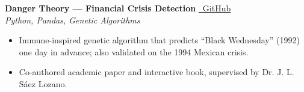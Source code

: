 \documentclass[12pt,a4paper]{article}
\begin{document}
\vspace{3pt}

\textbf{Danger Theory --- Financial Crisis Detection} \hfill \href{https://github.com/0xjoseangel/DANGER-THEORY-DT-}{\faGithub\ GitHub} \\
\textit{Python, Pandas, Genetic Algorithms}
\begin{itemize}[leftmargin=1.2em,itemsep=1pt,topsep=2pt,parsep=0pt]
  \item Immune-inspired genetic algorithm that predicts ``Black Wednesday'' (1992) one day in advance; also validated on the 1994 Mexican crisis.
  \item Co-authored academic paper and interactive book, supervised by Dr. J. L. Sáez Lozano.
\end{itemize}
\end{document}
